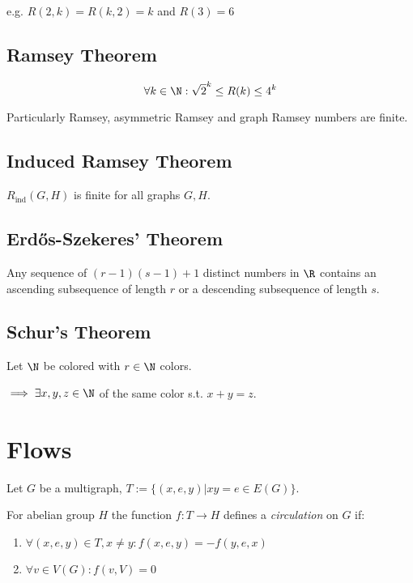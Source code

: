 \spacing

e.g. $R(2,k) = R(k,2) = k$ and $R(3) = 6$

\subsection*{Ramsey Theorem}

\vspace*{-2mm}
\[ \forall k \in \N : \sqrt{2}^k \leq R(k) \leq 4^k \]

Particularly Ramsey, asymmetric Ramsey and graph Ramsey numbers are finite.

\subsection*{Induced Ramsey Theorem}

$R_\text{ind}(G,H)$ is finite for all graphs $G, H$.

\subsection*{Erd\H{o}s-Szekeres' Theorem}

Any sequence of $(r-1)(s-1)+1$ distinct numbers in $\R$ contains an ascending subsequence of length $r$ or a descending subsequence of length $s$.

\subsection*{Schur's Theorem}

Let $\N$ be colored with $r \in \N$ colors.

$\implies \exists x, y, z \in \N$ of the same color s.t. $x+y=z$.

\section*{Flows}

Let $G$ be a multigraph, $T := \{(x,e,y) | xy = e \in E(G)\}$.

For abelian group $H$ the function $f : T \to H$ defines a \emph{circulation} on $G$ if:

\begin{enumerate}
	\item $\forall (x,e,y) \in T, x \neq y : f(x,e,y) = -f(y,e,x)$
	\item $\forall v \in V(G) : f(v,V) = 0$
\end{enumerate}

